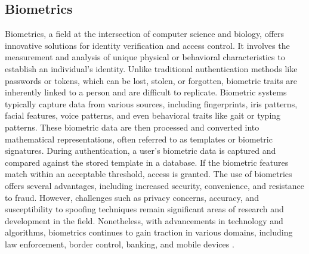 \documentclass[
]{article}
\begin{document}
\begin{multicols}{2}
\section{Biometrics}
Biometrics, a field at the intersection of computer science and biology, offers innovative solutions for identity verification and access control. It involves the measurement and analysis of unique physical or behavioral characteristics to establish an individual's identity. Unlike traditional authentication methods like passwords or tokens, which can be lost, stolen, or forgotten, biometric traits are inherently linked to a person and are difficult to replicate. Biometric systems typically capture data from various sources, including fingerprints, iris patterns, facial features, voice patterns, and even behavioral traits like gait or typing patterns. These biometric data are then processed and converted into mathematical representations, often referred to as templates or biometric signatures. During authentication, a user's biometric data is captured and compared against the stored template in a database. If the biometric features match within an acceptable threshold, access is granted. The use of biometrics offers several advantages, including increased security, convenience, and resistance to fraud. However, challenges such as privacy concerns, accuracy, and susceptibility to spoofing techniques remain significant areas of research and development in the field. Nonetheless, with advancements in technology and algorithms, biometrics continues to gain traction in various domains, including law enforcement, border control, banking, and mobile devices \cite{wang2023introduction}.

\end{multicols}



\end{document}

